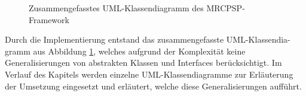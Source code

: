 \begin{figure}
    \centering
    \noindent{}
    \caption{Zusammengefasstes UML-Klassendiagramm des MRCPSP-Framework} 
    \label{img:mrcpsp_framework_klassendiagramm}
\end{figure}

Durch die Implementierung entstand das zusammengefasste UML-Klassendia-gramm aus Abbildung \ref{img:mrcpsp_framework_klassendiagramm}, welches aufgrund der Komplexität keine Generalisierungen von abstrakten Klassen und Interfaces berücksichtigt. Im Verlauf des Kapitels werden einzelne UML-Klassendiagramme zur Erläuterung der Umsetzung eingesetzt und erläutert, welche diese Generalisierungen aufführt. 

\newpage